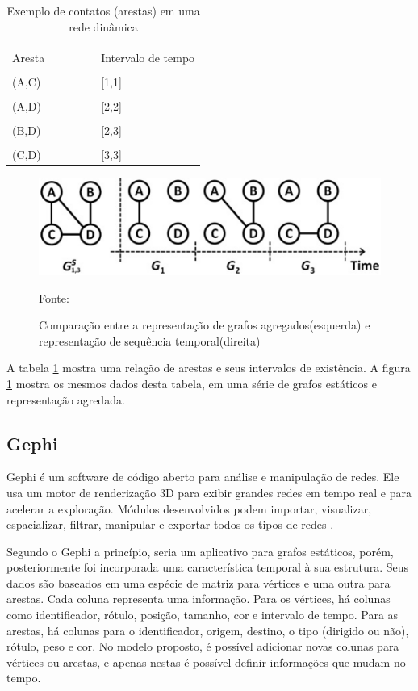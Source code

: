 \begin{table}[htbp]
	\centering
	\begin{tabular}{l l l l l l}
	\toprule
	\\Aresta & & & & & Intervalo de tempo\\
	\midrule
	\\(A,C) & & & & & [1,1]\\
	\\(A,D) & & & & & [2,2]\\
	\\(B,D) & & & & & [2,3]\\
	\\(C,D) & & & & & [3,3]\\
	\bottomrule
	\end{tabular}
\caption{Exemplo de contatos (arestas) em uma rede dinâmica}
 \label{tab:kim}
\end{table}

\begin{figure}[htbp]
\centering
 \includegraphics[width=.65\textwidth]{chapters/fig/grafoKim.png}
\caption{Comparação entre a representação de grafos agregados(esquerda) e representação de sequência temporal(direita)}
Fonte: \cite{kim}
\label{fig:grafoKim}
\end{figure}

A tabela \ref{tab:kim} mostra uma relação de arestas e seus intervalos de existência. A figura \ref{fig:grafoKim} mostra os mesmos
dados desta tabela, em uma série de grafos estáticos e representação agredada.

\subsection{Gephi}
Gephi é um software de código aberto para análise e manipulação de redes.
Ele usa um motor de renderização 3D para exibir grandes redes em tempo real e para acelerar a exploração.
Módulos desenvolvidos podem importar, visualizar, espacializar, filtrar, manipular e exportar todos os tipos de redes \cite{gephi}.

Segundo \cite{dynagraph} o Gephi a princípio, seria um aplicativo para grafos estáticos, porém, posteriormente
foi incorporada uma característica temporal à sua estrutura. Seus dados são baseados em
uma espécie de matriz para vértices e uma outra para arestas. Cada coluna representa uma
informação. Para os vértices, há colunas como identificador, rótulo, posição, tamanho, cor
e intervalo de tempo. Para as arestas, há colunas para o identificador, origem, destino, o
tipo (dirigido ou não), rótulo, peso e cor. No modelo proposto, é possível adicionar novas
colunas para vértices ou arestas, e apenas nestas é possível definir informações que mudam
no tempo.

